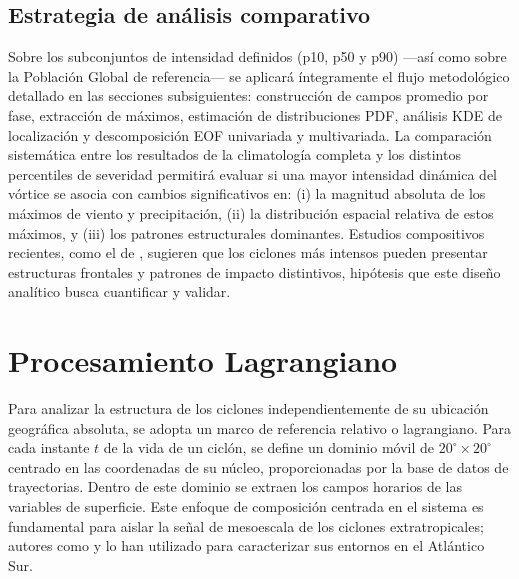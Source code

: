 \subsection{Estrategia de análisis comparativo}\label{subsec:estrategia_analise}

Sobre los subconjuntos de intensidad definidos (p10, p50 y p90) —así como sobre la Población Global de referencia— se aplicará íntegramente el flujo metodológico detallado en las secciones subsiguientes: construcción de campos promedio por fase, extracción de máximos, estimación de distribuciones PDF, análisis KDE de localización y descomposición EOF univariada y multivariada. La comparación sistemática entre los resultados de la climatología completa y los distintos percentiles de severidad permitirá evaluar si una mayor intensidad dinámica del vórtice se asocia con cambios significativos en: (i) la magnitud absoluta de los máximos de viento y precipitación, (ii) la distribución espacial relativa de estos máximos, y (iii) los patrones estructurales dominantes. Estudios compositivos recientes, como el de \citet{andrade2024composite}, sugieren que los ciclones más intensos pueden presentar estructuras frontales y patrones de impacto distintivos, hipótesis que este diseño analítico busca cuantificar y validar.

\section{Procesamiento Lagrangiano}\label{sec:procesamiento_lagrangiano}

Para analizar la estructura de los ciclones independientemente de su ubicación geográfica absoluta, se adopta un marco de referencia relativo o lagrangiano. Para cada instante $t$ de la vida de un ciclón, se define un dominio móvil de $20^{\circ} \times 20^{\circ}$ centrado en las coordenadas de su núcleo, proporcionadas por la base de datos de trayectorias. Dentro de este dominio se extraen los campos horarios de las variables de superficie. 
Este enfoque de composición centrada en el sistema es fundamental para aislar la señal de mesoescala de los ciclones extratropicales; autores como \citet{crespo2020potential} y \citet{priestley2022improved} lo han utilizado para caracterizar sus entornos en el Atlántico Sur.

